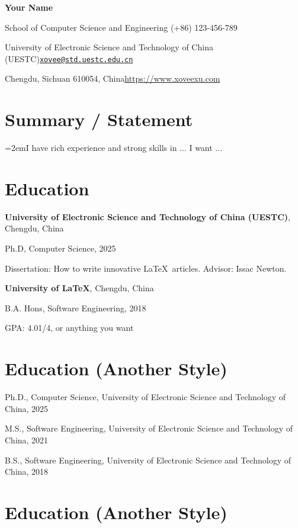 \documentclass{article}
\newcommand{\cvsection}[1]{\section*{\rmfamily#1}}
\begin{document}
\begin{center}
    \Huge{
    \rmfamily
    \textbf{Your Name}}
\end{center}
\vspace{20pt}


\setlength{\parskip}{1pt}
\renewcommand{\arraystretch}{1.25}


\noindent School of Computer Science and Engineering \hfill (+86) 123-456-789

\noindent University of Electronic Science and Technology of China (UESTC)\hfill \href{mailto:xovee@std.uestc.edu.cn}{\texttt{xovee@std.uestc.edu.cn}}

\noindent Chengdu, Sichuan 610054, China\hfill \url{https://www.xoveexu.com}


\setlength{\parskip}{3pt}




\cvsection{Summary / Statement}
\indent

\hangindent=2emI have rich experience and strong skills in ... I want ...


\cvsection{Education}
\indent 

\textbf{University of Electronic Science and Technology of China (UESTC)}, Chengdu, China

\hspace{2em}Ph.D, Computer Science, 2025

\hspace{2em}Dissertation: How to write innovative \LaTeX~articles. Advisor: Issac Newton.

\textbf{University of LaTeX}, Chengdu, China

\hspace{2em}B.A. Hons, Software Engineering, 2018

\hspace{2em}GPA: 4.01/4, or anything you want


\cvsection{Education (Another Style)}
\indent 

Ph.D., Computer Science, University of Electronic Science and Technology of China, 2025

M.S., Software Engineering, University of Electronic Science and Technology of China, 2021

B.S., Software Engineering, University of Electronic Science and Technology of China, 2018


\cvsection{Education (Another Style)}
\indent 
\end{document}
